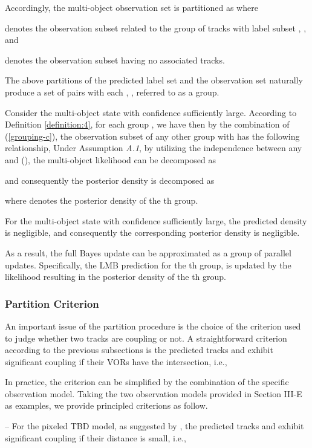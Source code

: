\documentclass[journal]{IEEEtran}
\begin{document}
{Accordingly,  the multi-object observation set  is partitioned as  where 

  denotes the observation subset related to the group of tracks with label subset ,  , and 

 denotes the observation subset  having no associated tracks.

The above partitions of the predicted label set and the observation set naturally produce a set of  pairs  with each , ,  referred to as a group. 


Consider the multi-object state  with  confidence  sufficiently large. According to Definition \ref{definition:4}, for each group , we have 
 then by the combination of (\ref{grouping-c}), the observation subset  of  any other group with  has the following relationship,
 Under Assumption \textit{A.1}, by utilizing the independence between any  and  (), the multi-object  likelihood can be  decomposed 
as

and consequently the posterior density is decomposed as

where  denotes the posterior density of the th group.

For the multi-object state  with  confidence  sufficiently large, the predicted density  is negligible, and consequently the corresponding posterior density  is negligible.


As a result,  the full Bayes update  can be approximated as  a group  of parallel  updates.  Specifically, the LMB prediction  for the th group, 
is updated by the  likelihood   resulting in the posterior density  of the th group.
\subsubsection{Partition Criterion}
An important issue of the partition procedure is  the choice of the criterion used to  judge whether two tracks are coupling or not.  A straightforward criterion according to the previous subsections  is 
the  predicted tracks  and  exhibit significant coupling  if their VORs have the intersection, i.e., 





In practice, the criterion can be simplified by the combination of the specific observation model.  Taking the two observation models provided in Section III-E as examples, we provide principled criterions as follow.


 -- For the pixeled TBD model, 
 as suggested by \cite{refr:tbd-2,refr:tbd-3, refr:tbd-4},  the  predicted tracks  and  exhibit significant coupling 
if their distance is small, i.e.,

}
\end{document}
